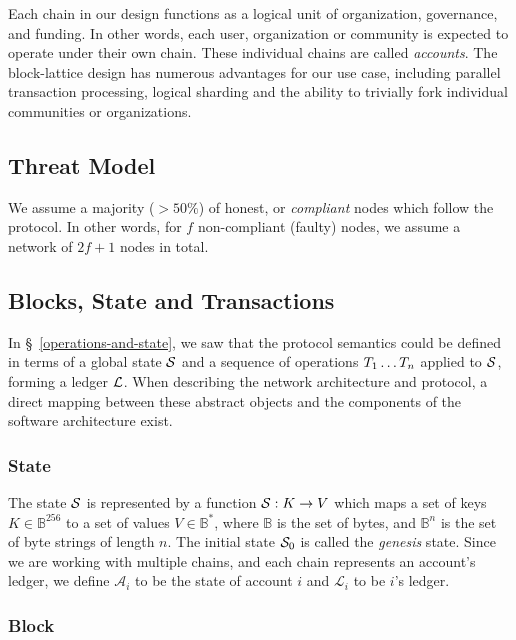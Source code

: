 Each chain in our design functions as a logical unit of organization,
governance, and funding. In other words, each user, organization or community
is expected to operate under their own chain. These individual chains are
called \emph{accounts}. The block-lattice design has numerous advantages for
our use case, including parallel transaction processing, logical sharding and
the ability to trivially fork individual communities or organizations.

\subsection{Threat Model}

We assume a majority ($> 50\%$) of honest, or \emph{compliant} nodes which follow
the protocol. In other words, for $f$ non-compliant (faulty) nodes, we assume a
network of $2f+1$ nodes in total.

\subsection{Blocks, State and Transactions}

In \S~\ref{operations-and-state}, we saw that the protocol semantics could
be defined in terms of a global state $\mathcal{S}$ and a sequence of operations
$T_1 \dotso T_n$ applied to $\mathcal{S}$, forming a ledger $\mathcal{L}$. When
describing the network architecture and protocol, a direct mapping between
these abstract objects and the components of the software architecture exist.

\subsubsection{State}

The state $\mathcal{S}$ is represented by a function $\mathcal{S} : K \to V$ which maps a
set of keys $K \in \mathbb{B}^{256}$ to a set of values $V \in \mathbb{B}^{*}$,
where $\mathbb{B}$ is the set of bytes, and $\mathbb{B}^n$ is the set of byte
strings of length $n$. The initial state $\mathcal{S}_0$ is called the
\emph{genesis} state. Since we are working with multiple chains, and each
chain represents an account's ledger, we define $\mathcal{A}_i$ to be the state
of account $i$ and $\mathcal{L}_i$ to be $i$'s ledger.

\subsubsection{Block}

